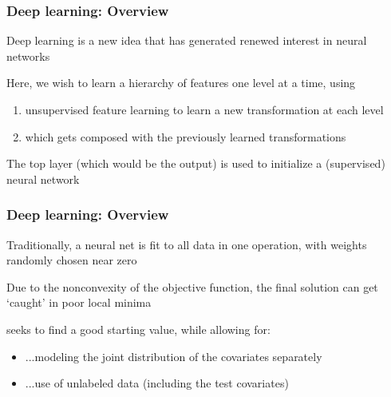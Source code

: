 \documentclass[12pt]{beamer}
\begin{document}
\begin{frame}[fragile]
\frametitle{Deep learning: Overview}
Deep learning is a new idea that has generated renewed interest in neural networks
 
 \vsp
 Here, we wish to learn a hierarchy of features one level at a time, using 
 \begin{enumerate}
 \item  unsupervised feature learning to learn a new transformation at each level
 \item which gets composed with the previously learned transformations
 \end{enumerate}
 

\vsp
The top layer (which would be the output) is used to initialize a  (supervised) neural network 



\end{frame}

\begin{frame}[fragile]
\frametitle{Deep learning: Overview}


\vsp
Traditionally, a neural net is fit to all  data in one operation, with weights
randomly chosen near zero

\vsp
Due to the nonconvexity of the objective function, the final solution can get `caught' in poor local minima

\vsp
{} seeks to find a good starting value, while allowing for:

\begin{itemize}
\item  ...modeling the joint distribution of the covariates separately
\item  ...use of unlabeled data (including the test covariates)
\end{itemize}

\end{frame}
\end{document}
